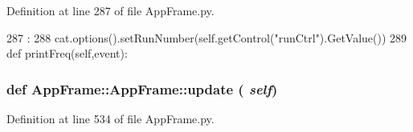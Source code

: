 Definition at line 287 of file AppFrame.py.


\begin{DoxyCode}
287                            :
288         cat.options().setRunNumber(self.getControl("runCtrl").GetValue()) 
289 
    def printFreq(self,event):
\end{DoxyCode}
\hypertarget{classAppFrame_1_1AppFrame_aa01fc511db7b94a62d550a0087d750b9}{
\subsubsection[{update}]{\setlength{\rightskip}{0pt plus 5cm}def AppFrame::AppFrame::update ( {\em self})}}
\label{classAppFrame_1_1AppFrame_aa01fc511db7b94a62d550a0087d750b9}


Definition at line 534 of file AppFrame.py.



